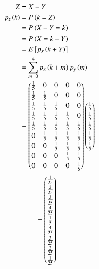 \documentclass[journal,12pt,onecolumn]{IEEEtran}
\theoremstyle{remark}
\begin{document}
\begin{align}
	Z &= X - Y\\
	p_z\brak{k} &= P\brak{k = Z} \\
	&= P\brak{X-Y = k}\\
	&= P\brak{X = k + Y}\\
	&= E\sbrak{p_x\brak{k + Y}}\\
	&= \sum_{m = 0}^{4} p_x\brak{k + m} p_y\brak{m}\\
	&= \myvec{\frac{1}{5} & 0 & 0 & 0 & 0 \vspace{2pt} \\
		  \frac{1}{5} & \frac{1}{5} & 0 & 0 & 0 \vspace{2pt}\\
		  \frac{1}{5} & \frac{1}{5} & \frac{1}{5} & 0 & 0 \vspace{2pt}\\
		  \frac{1}{5} & \frac{1}{5} & \frac{1}{5} & \frac{1}{5} & 0 \vspace{2pt}\\
		  \frac{1}{5} & \frac{1}{5} & \frac{1}{5} & \frac{1}{5} & \frac{1}{5} \vspace{2pt}\\
		  0 & \frac{1}{5} & \frac{1}{5} & \frac{1}{5} & \frac{1}{5} \vspace{2pt}\\
		  0 & 0 & \frac{1}{5} & \frac{1}{5} & \frac{1}{5}\vspace{2pt}\\
		  0 & 0 & 0 & \frac{1}{5} & \frac{1}{5} \vspace{2pt}\\
		  0 & 0 & 0 & 0 & \frac{1}{5}}
	  \myvec{\frac{1}{5} \vspace{2pt} \\ \frac{1}{5} \vspace{2pt} \\ \frac{1}{5} \vspace{2pt} \\ \frac{1}{5} \vspace{2pt} \\ \frac{1}{5}}
\end{align}
\begin{align}
	&= \myvec{\frac{1}{25} \vspace{2pt}\\ \frac{2}{25} \vspace{2pt} \\ \frac{3}{25} \vspace{2pt} \\ \frac{4}{25} \vspace{2pt} \\ \frac{1}{5} \vspace{2pt}\\	  \frac{4}{25} \vspace{2pt} \\ \frac{3}{25} \vspace{2pt} \\ \frac{2}{25} \vspace{2pt} \\ \frac{1}{25}}
\end{align}
\end{document}
